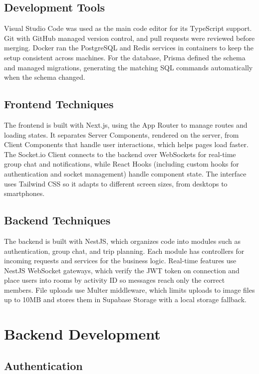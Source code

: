 \documentclass[a4paper,12pt]{report}
\begin{document}
\subsection{Development Tools}

Visual Studio Code was used as the main code editor for its TypeScript support. Git with GitHub managed version control, and pull requests were reviewed before merging. Docker ran the PostgreSQL and Redis services in containers to keep the setup consistent across machines. For the database, Prisma defined the schema and managed migrations, generating the matching SQL commands automatically when the schema changed.

\subsection{Frontend Techniques}

The frontend is built with Next.js, using the App Router to manage routes and loading states. It separates Server Components, rendered on the server, from Client Components that handle user interactions, which helps pages load faster. The Socket.io Client connects to the backend over WebSockets for real-time group chat and notifications, while React Hooks (including custom hooks for authentication and socket management) handle component state. The interface uses Tailwind CSS so it adapts to different screen sizes, from desktops to smartphones.

\subsection{Backend Techniques}

The backend is built with NestJS, which organizes code into modules such as authentication, group chat, and trip planning. Each module has controllers for incoming requests and services for the business logic. Real-time features use NestJS WebSocket gateways, which verify the JWT token on connection and place users into rooms by activity ID so messages reach only the correct members. File uploads use Multer middleware, which limits uploads to image files up to 10MB and stores them in Supabase Storage with a local storage fallback.

\section{Backend Development}
\subsection{Authentication}
\end{document}
